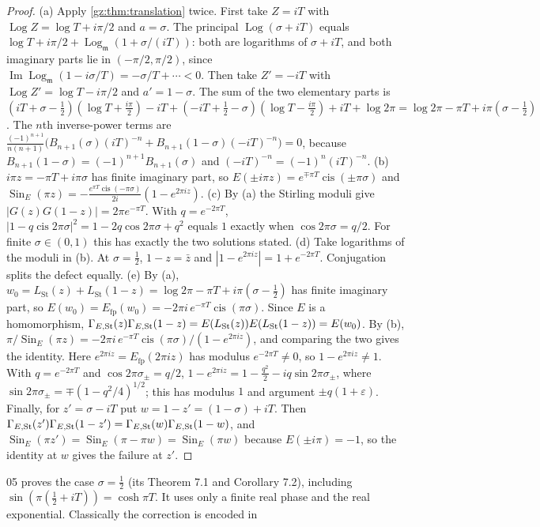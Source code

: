 \documentclass[11pt,a4paper]{article}
\numberwithin{equation}{section}
\theoremstyle{definition}
\theoremstyle{remark}
\newcommand{\mm}{\mathfrak m}
\newcommand{\eps}{\varepsilon}
\renewcommand{\Im}{\operatorname{Im}}
\newcommand{\cis}{\operatorname{cis}}
\newcommand{\Log}{\operatorname{Log}}
\newcommand{\Lgm}{\operatorname{Log}_{\mm}}
\newcommand{\Efp}{E_{\mathrm{fp}}}
\newcommand{\Sin}{\operatorname{Sin}}
\newcommand{\LSt}{L_{\mathrm{St}}}
\begin{document}
\begin{proof}
(a) Apply \cref{gz:thm:translation} twice. First take $Z=iT$ with
$\Log Z=\log T+i\pi/2$ and $a=\sigma$. The principal $\Log(\sigma+iT)$ equals
$\log T+i\pi/2+\Lgm(1+\sigma/(iT))$: both are logarithms of $\sigma+iT$, and
both imaginary parts lie in $(-\pi/2,\pi/2)$, since
$\Im\Lgm(1-i\sigma/T)=-\sigma/T+\cdots<0$. Then take $Z'=-iT$ with
$\Log Z'=\log T-i\pi/2$ and $a'=1-\sigma$. The sum of the two elementary
parts is
$(iT+\sigma-\tfrac12)(\log T+\tfrac{i\pi}2)-iT+(-iT+\tfrac12-\sigma)(\log T-\tfrac{i\pi}2)+iT+\log2\pi=\log2\pi-\pi T+i\pi(\sigma-\tfrac12)$.
The $n$th inverse-power terms are
$\frac{(-1)^{n+1}}{n(n+1)}\bigl(B_{n+1}(\sigma)(iT)^{-n}+B_{n+1}(1-\sigma)(-iT)^{-n}\bigr)=0$,
because $B_{n+1}(1-\sigma)=(-1)^{n+1}B_{n+1}(\sigma)$ and
$(-iT)^{-n}=(-1)^n(iT)^{-n}$. (b) $i\pi z=-\pi T+i\pi\sigma$ has finite
imaginary part, so $E(\pm i\pi z)=e^{\mp\pi T}\cis(\pm\pi\sigma)$ and
$\Sin_E(\pi z)=-\frac{e^{\pi T}\cis(-\pi\sigma)}{2i}(1-e^{2\pi iz})$. (c) By
(a) the Stirling moduli give $|G(z)G(1-z)|=2\pi e^{-\pi T}$. With
$q=e^{-2\pi T}$, $|1-q\cis2\pi\sigma|^2=1-2q\cos2\pi\sigma+q^2$ equals $1$
exactly when $\cos2\pi\sigma=q/2$. For finite $\sigma\in(0,1)$ this has
exactly the two solutions stated. (d) Take logarithms of the moduli in (b).
At $\sigma=\tfrac12$, $1-z=\bar z$ and $|1-e^{2\pi iz}|=1+e^{-2\pi T}$.
Conjugation splits the defect equally. (e) By (a),
$w_0=\LSt(z)+\LSt(1-z)=\log2\pi-\pi T+i\pi(\sigma-\tfrac12)$ has finite
imaginary part, so $E(w_0)=\Efp(w_0)=-2\pi i\,e^{-\pi T}\cis(\pi\sigma)$.
Since $E$ is a homomorphism,
$\Gamma_{E,\rm St}(z)\Gamma_{E,\rm St}(1-z)=E(\LSt(z))E(\LSt(1-z))=E(w_0)$.
By (b), $\pi/\Sin_E(\pi z)=-2\pi i\,e^{-\pi T}\cis(\pi\sigma)/(1-e^{2\pi iz})$,
and comparing the two gives the identity. Here $e^{2\pi iz}=\Efp(2\pi iz)$
has modulus $e^{-2\pi T}\ne0$, so $1-e^{2\pi iz}\ne1$. With $q=e^{-2\pi T}$
and $\cos2\pi\sigma_\pm=q/2$, $1-e^{2\pi iz}=1-\tfrac{q^2}2-iq\sin2\pi\sigma_\pm$,
where $\sin2\pi\sigma_\pm=\mp(1-q^2/4)^{1/2}$; this has modulus $1$ and
argument $\pm q(1+\eps)$. Finally, for $z'=\sigma-iT$ put $w=1-z'=(1-\sigma)+iT$.
Then $\Gamma_{E,\rm St}(z')\Gamma_{E,\rm St}(1-z')=\Gamma_{E,\rm St}(w)\Gamma_{E,\rm St}(1-w)$,
and $\Sin_E(\pi z')=\Sin_E(\pi-\pi w)=\Sin_E(\pi w)$ because $E(\pm i\pi)=-1$,
so the identity at $w$ gives the failure at $z'$.
\end{proof}
05 proves the case $\sigma=\tfrac12$ (its Theorem 7.1 and Corollary 7.2),
including $\sin(\pi(\tfrac12+iT))=\cosh\pi T$. It uses only a finite real
phase and the real exponential. Classically the correction is encoded in
\end{document}
